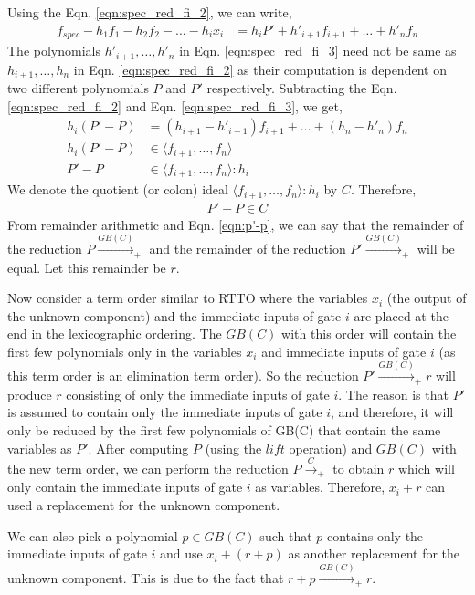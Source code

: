 \documentclass[twocolumn]{IEEEtran}
\theoremstyle{definition}
\begin{document}
\par Using the Eqn. \ref{eqn:spec_red_fi_2}, we can write,
\begin{align}
\label{eqn:spec_red_fi_3}
f_{spec}-h_1f_1-h_2f_2-\dots-h_ix_i&= h_iP'+h'_{i+1}f_{i+1} +\dots+ h'_nf_n
\end{align}
The polynomials $h'_{i+1}, \dots, h'_n$ in Eqn. \ref{eqn:spec_red_fi_3} need not be 
same as $h_{i+1}, \dots, h_n$ in Eqn. \ref{eqn:spec_red_fi_2} as their computation is dependent on
two different polynomials $P$ and $P'$ respectively. Subtracting the Eqn. \ref{eqn:spec_red_fi_2}
and Eqn. \ref{eqn:spec_red_fi_3}, we get,
\begin{align*}
h_i(P'-P) &= (h_{i+1}-h'_{i+1})f_{i+1} +\dots+ (h_n-h'_n)f_n \\
h_i(P'-P) &\in \langle f_{i+1},\dots,f_n \rangle \\
P'-P &\in \langle f_{i+1},\dots,f_n \rangle:h_i
\end{align*}
We denote the quotient (or colon) ideal $\langle f_{i+1},\dots,f_n \rangle:h_i$
by $C$. Therefore,
\begin{align}
\label{eqn:p'-p}
P'-P \in C
\end{align}
From remainder arithmetic and Eqn. \ref{eqn:p'-p}, we can say that the remainder of the reduction
$P\xrightarrow{GB(C)}_+$ and the remainder of the reduction $P'\xrightarrow{GB(C)}_+$ will be equal.
Let this remainder be $r$. 
\par Now consider a term order similar to RTTO where the variables $x_i$ (the 
output of the unknown component) and the immediate inputs of gate $i$ are placed at the end
in the lexicographic ordering. The $GB(C)$ with this order will contain the first few polynomials only in 
the variables $x_i$ and immediate inputs of gate $i$ (as this term order is an elimination term order).
So the reduction $P'\xrightarrow{GB(C)}_+r$ will produce $r$ consisting of only the immediate inputs
of gate $i$. The reason is that $P'$ is assumed to contain only the immediate inputs of gate $i$, and therefore,
it will only be reduced by the first few polynomials of GB(C) that contain the same variables as $P'$.
After computing $P$ (using the $lift$ operation) and $GB(C)$ with the new term order, we can 
perform the reduction $P\xrightarrow{C}_+$ to obtain $r$ which will only contain the immediate 
inputs of gate $i$ as variables. Therefore, $x_i+r$ can used a replacement for the unknown component.

 \par We can also pick a polynomial $p\in GB(C)$ such that $p$ contains only the immediate 
 inputs of gate $i$ and use $x_i +(r+p)$ as another replacement for the unknown component. This
 is due to the fact that $r+p \xrightarrow{GB(C)}_+r$.



%
% 
% 

% 
\end{document}
